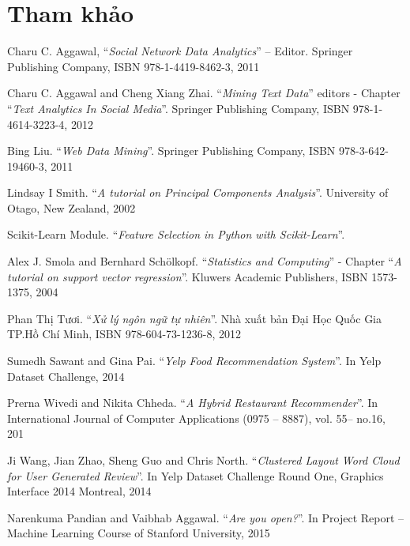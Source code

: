 \documentclass[12pt]{extarticle}
\begin{document}
	\section {Tham khảo}
	\par [1]	\hspace{4pt}	Charu C. Aggawal, “\textit{Social Network Data Analytics}” – Editor. Springer Publishing Company, ISBN 978-1-4419-8462-3, 2011
\par [2]	\hspace{4pt}	Charu C. Aggawal and Cheng Xiang Zhai. “\textit{Mining Text Data}” editors - Chapter “\textit{Text Analytics In Social Media}”. Springer Publishing Company, ISBN 978-1-4614-3223-4, 2012
\par [3]	\hspace{4pt}	Bing Liu. “\textit{Web Data Mining}”. Springer Publishing Company, ISBN 978-3-642-19460-3, 2011
\par [4]	\hspace{4pt}	Lindsay I Smith. “\textit{A tutorial on Principal Components Analysis}”. University of Otago, New Zealand, 2002
\par [5]	\hspace{4pt}	Scikit-Learn Module. “\textit{Feature Selection in Python with Scikit-Learn}”.
\par [6]	\hspace{4pt}	Alex J. Smola and Bernhard Schölkopf. “\textit{Statistics and Computing}” - Chapter “\textit{A tutorial on support vector regression}”. Kluwers Academic Publishers, ISBN 1573-1375, 2004
\par [7]	\hspace{4pt}	Phan Thị Tươi. “\textit{Xử lý ngôn ngữ tự nhiên}”. Nhà xuất bản Đại Học Quốc Gia TP.Hồ Chí Minh, ISBN 978-604-73-1236-8, 2012
\par [8]	\hspace{4pt}	Sumedh Sawant and Gina Pai. “\textit{Yelp Food Recommendation System}”. In Yelp Dataset Challenge, 2014
\par [9]	\hspace{4pt} 	Prerna Wivedi and Nikita Chheda. “\textit{A Hybrid Restaurant Recommender}”. In International Journal of Computer Applications (0975 – 8887), vol. 55– no.16, 201
\par [10]	\hspace{4pt} Ji Wang, Jian Zhao, Sheng Guo and Chris North. “\textit{Clustered Layout Word Cloud for User Generated Review}”. In Yelp Dataset Challenge Round One, Graphics Interface 2014 Montreal, 2014
\par [11]\hspace{4pt}	Narenkuma Pandian and Vaibhab Aggawal. “\textit{Are you open?}”. In Project Report – Machine Learning Course of Stanford University, 2015
\end{document}
